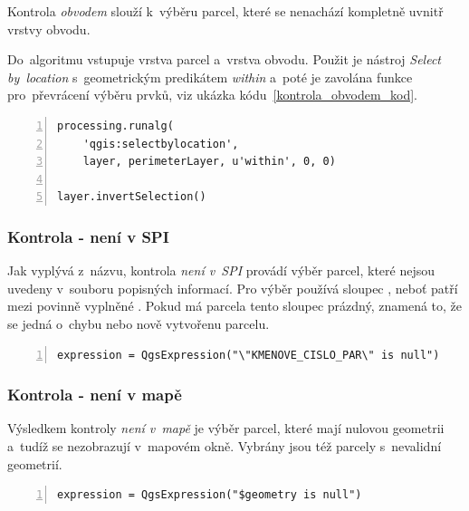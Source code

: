 Kontrola \textit{obvodem} slouží k~výběru parcel, které se nenachází kompletně uvnitř vrstvy obvodu.

Do~algoritmu vstupuje vrstva parcel a~vrstva obvodu. Použit je nástroj \textit{Select by~location} s~geometrickým predikátem \textit{within} a~poté je zavolána funkce pro~převrácení výběru prvků, viz ukázka kódu~\ref{kontrola_obvodem_kod}.

{\scriptsize
\begin{lstlisting}[style=python, caption={Kontrola \textit{obvodem}~– výběr prvků}, captionpos=b, label=kontrola_obvodem_kod, backgroundcolor = \color{light-gray},  numbers=left]
processing.runalg(
    'qgis:selectbylocation',
    layer, perimeterLayer, u'within', 0, 0)

layer.invertSelection()
\end{lstlisting}}

\subsubsection{Kontrola - není v SPI}
\label{kontrola_neni_v_spi}

Jak vyplývá z~názvu, kontrola \textit{není v~SPI} provádí výběr parcel, které nejsou uvedeny v~souboru popisných informací. Pro výběr používá sloupec \texttt{}, neboť patří mezi povinně vyplněné \citep{struktura_vfk}. Pokud má parcela tento sloupec prázdný, znamená to, že se jedná o~chybu nebo nově vytvořenu parcelu.

{\scriptsize
\begin{lstlisting}[style=python, caption={Kontrola \textit{není v~SPI}~– vzorec pro~výběr prvků}, captionpos=b, label=kontrola_spi_kod, backgroundcolor = \color{light-gray},  numbers=left]
expression = QgsExpression("\"KMENOVE_CISLO_PAR\" is null")
\end{lstlisting}}

\subsubsection{Kontrola - není v mapě}
\label{kontrola_neni_v_mape}

Výsledkem kontroly \textit{není v~mapě} je výběr parcel, které mají nulovou geometrii a~tudíž se nezobrazují v~mapovém okně. Vybrány jsou též parcely s~nevalidní geometrií.

{\scriptsize
\begin{lstlisting}[style=python, caption={Kontrola \textit{není v~mapě}~– vzorec pro~výběr prvků}, captionpos=b, label=kontrola_mapa_kod, backgroundcolor = \color{light-gray},  numbers=left]
expression = QgsExpression("$geometry is null")
\end{lstlisting}}


